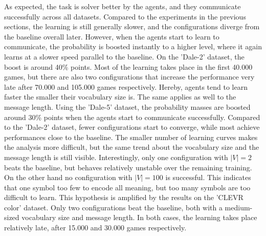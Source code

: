 As expected, the task is solver better by the agents, and they communicate successfully across all datasets.
Compared to the experiments in the previous sections, the learning is still generally slower, and the configurations diverge from the baseline overall later.
However, when the agents start to learn to communicate, the probability is boosted instantly to a higher level, where it again learns at a slower speed parallel to the baseline.
On the 'Dale-2' dataset, the boost is around 40\% points.
Most of the learning takes place in the first 40.000 games, but there are also two configurations that increase the performance very late after 70.000 and 105.000 games respectively.
Hereby, agents tend to learn faster the smaller their vocabulary size is.
The same applies as well to the message length.
Using the 'Dale-5' dataset, the probability masses are boosted around 30\% points when the agents start to communicate successfully.
Compared to the 'Dale-2' dataset, fewer configurations start to converge, while most achieve performances close to the baseline.
The smaller number of learning curves makes the analysis more difficult, but the same trend about the vocabulary size and the message length is still visible.
Interestingly, only one configuration with $|V|=2$ beats the baseline, but behaves relatively unstable over the remaining training.
On the other hand no configuration with $|V|=100$ is successful.
This indicates that one symbol too few to encode all meaning, but too many symbols are too difficult to learn.
This hypothesis is amplified by the results on the 'CLEVR color' dataset.
Only two configurations beat the baseline, both with a medium-sized vocabulary size and message length.
In both cases, the learning takes place relatively late, after 15.000 and 30.000 games respectively.

